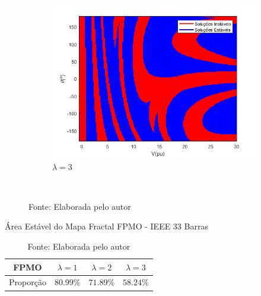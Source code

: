 \begin{figure}[H]
\begin{subfigure}[b]{0.45\textwidth}
        \centering
        \includegraphics[width=\textwidth]{textuais/capitulo4/figuras/33_FPOM_3lambda.png}
        \caption{$\lambda=3$}
    \end{subfigure}
        \\
   \caption*{Fonte: Elaborada pelo autor}
   \label{fig:FPMO-33}
\end{figure}

\begin{table}[H]
    \centering
    \caption{Área Estável do Mapa Fractal FPMO - IEEE 33 Barras}
    \begin{tabular}{c c c c}
        \toprule
        FPMO & $\lambda = 1$ & $\lambda = 2$ & $\lambda = 3$ \\
        \midrule
        Proporção & $80.99\%$ & $71.89\%$ & $58.24\%$ \\
        \bottomrule
    \end{tabular}
    \caption*{Fonte: Elaborada pelo autor}
    \label{tabela_fractal_FPMO_33}
\end{table}

